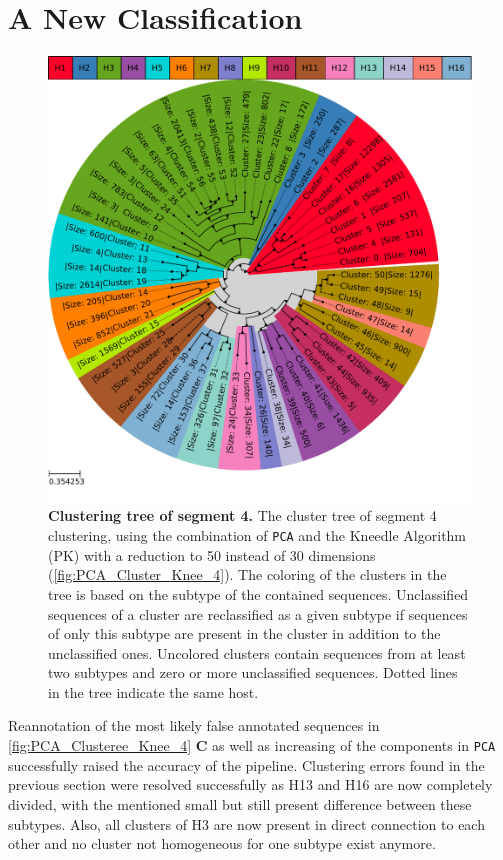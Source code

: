 \section{A New Classification} \label{sec:Serotype_Classification}

\begin{figure}[!hbt]
    \centering
    \includegraphics[width=\textwidth]{Results/Clustertree_Segment_4.pdf}
    \caption[Clustering tree of segment 4]{\textbf{Clustering tree of segment 4.} The cluster tree of segment 4 clustering, using the combination of \texttt{PCA} and the Kneedle Algorithm (PK) with a reduction to 50 instead of 30 dimensions (\autoref{fig:PCA_Cluster_Knee_4}). The coloring of the clusters in the tree is based on the subtype of the contained sequences. Unclassified sequences of a cluster are reclassified as a given subtype if sequences of only this subtype are present in the cluster in addition to the unclassified ones. Uncolored clusters contain sequences from at least two subtypes and zero or more unclassified sequences. Dotted lines in the tree indicate the same host.}
    \label{fig:Result_Clustertree_Segment_4}
\end{figure}

Reannotation of the most likely false annotated sequences in \autoref{fig:PCA_Clusteree_Knee_4} \textbf{\textsf{C}} as well as increasing of the components in \texttt{PCA} successfully raised the accuracy of the pipeline. Clustering errors found in the previous section were resolved successfully as H13 and H16 are now completely divided, with the mentioned small but still present difference between these subtypes. Also, all clusters of H3 are now present in direct connection to each other and no cluster not homogeneous for one subtype exist anymore. 

